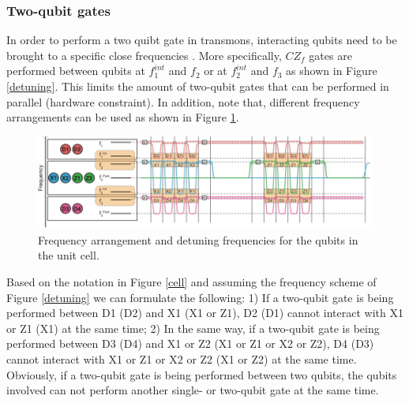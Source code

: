 \subsubsection{Two-qubit gates}

In order to perform a two quibt gate in transmons, interacting qubits need to be brought to a specific close frequencies \cite{versluis2016scalable}. More specifically, $CZ_f$ gates are performed between qubits at $f^{int}_1$ and $f_2$ or at $f^{int}_2$ and $f_3$ as shown in Figure \ref{detuning}. This limits the amount of two-qubit gates that can be performed in parallel (hardware constraint). In addition, note that, different frequency arrangements can be used as shown in Figure \ref{sequence}. 


\begin{figure}[h!]
  \centerline{
    \includegraphics[width=5in]{figures/detuning.png}
    }
\caption{Frequency arrangement and detuning frequencies for the qubits in the unit cell.}
\label{sequence}
\end{figure}


Based on the notation in Figure \ref{cell} and assuming the frequency scheme of Figure \ref{detuning} we can formulate the following: 1) If a two-qubit gate is being performed between D1 (D2) and X1 (X1 or Z1), D2 (D1) cannot interact with X1 or Z1 (X1) at the same time; 2) In the same way, if a two-qubit gate is being performed between D3 (D4) and X1 or Z2 (X1 or Z1 or X2 or Z2), D4 (D3) cannot interact with X1 or Z1 or X2 or Z2 (X1 or Z2) at the same time. Obviously,  if a two-qubit gate is being performed between two qubits, the qubits involved can not perform another single- or two-qubit gate at the same time.

